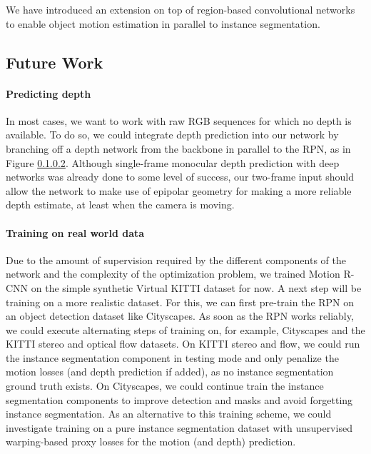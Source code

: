We have introduced an extension on top of region-based convolutional networks to enable object motion estimation
in parallel to instance segmentation.

\subsection{Future Work}
\paragraph{Predicting depth}
In most cases, we want to work with raw RGB sequences for which no depth is available.
To do so, we could integrate depth prediction into our network by branching off a
depth network from the backbone in parallel to the RPN, as in Figure \ref{}.
Although single-frame monocular depth prediction with deep networks was already done
to some level of success,
our two-frame input should allow the network to make use of epipolar
geometry for making a more reliable depth estimate, at least when the camera
is moving.

\paragraph{Training on real world data}
Due to the amount of supervision required by the different components of the network
and the complexity of the optimization problem,
we trained Motion R-CNN on the simple synthetic Virtual KITTI dataset for now.
A next step will be training on a more realistic dataset.
For this, we can first pre-train the RPN on an object detection dataset like
Cityscapes. As soon as the RPN works reliably, we could execute alternating
steps of training on, for example, Cityscapes and the KITTI stereo and optical flow datasets.
On KITTI stereo and flow, we could run the instance segmentation component in testing mode and only penalize
the motion losses (and depth prediction if added), as no instance segmentation ground truth exists.
On Cityscapes, we could continue train the instance segmentation components to
improve detection and masks and avoid forgetting instance segmentation.
As an alternative to this training scheme, we could investigate training on a pure
instance segmentation dataset with unsupervised warping-based proxy losses for the motion (and depth) prediction.
